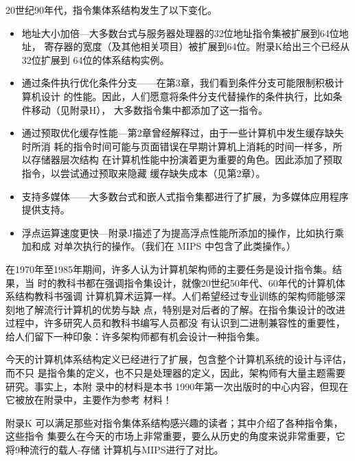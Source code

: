 20世纪90年代，指令集体系结构发生了以下变化。

\begin{itemize}
    \item 地址大小加倍—大多数台式与服务器处理器的32位地址指令集被扩展到64位地址，
    寄存器的宽度（及其他相关项目）被扩展到64位。附录K给出三个已经从32位扩展到
    64位的体系结构实例。
    \item 通过条件执行优化条件分支——在第3章，我们看到条件分支可能限制积极计算机设计
    的性能。因此，人们愿意将条件分支代替操作的条件执行，比如条件移动（见附录H），
    大多数指令集中都添加了这一指令。
    \item 通过预取优化缓存性能—第2章曾经解释过，由于一些计算机中发生缓存缺失时所消
    耗的指令时间可能与页面错误在早期计算机上消耗的时间一样多，所以存储器层次结构
    在计算机性能中扮演着更为重要的角色。因此添加了预取指令，以尝试通过预取来隐藏
    缓存缺失成本（见第2章）。
    \item 支持多媒体——大多数台式和嵌人式指令集都进行了扩展，为多媒体应用程序提供支持。
    \item 浮点运算速度更快—附录J描述了为提高浮点性能所添加的操作，比如执行乘加和成
    对单次执行的操作。（我们在 MIPS 中包含了此类操作。）
\end{itemize}

在1970年至1985年期间，许多人认为计算机架构师的主要任务是设计指令集。结果，当
时的教科书都在强调指令集设计，就像20世纪50年代、60年代的计算机体系结构教科书强调
计算机算术运算一样。人们希望经过专业训练的架构师能够深刻地了解流行计算机的优势与缺
点，特别是对后者的了解。在指令集设计的改进过程中，许多研究人员和教科书编写人员都没
有认识到二进制兼容性的重要性，给人们留下一种印象：许多架构师都有机会设计一种指令集。

今天的计算机体系结构定义已经进行了扩展，包含整个计算机系统的设计与评估，而不只
是指令集的定义，也不只是处理器的定义，因此，架构师有大量主题需要研究。事实上，本附
录中的材料是本书 1990年第一次出版时的中心内容，但现在它被放在附录中，主要作为参考
材料！

附录K 可以满足那些对指令集体系结构感兴趣的读者；其中介绍了各种指令集，这些指令
集要么在今天的市场上非常重要，要么从历史的角度来说非常重要，它将9种流行的载人-存储
计算机与MIPS进行了对比。

